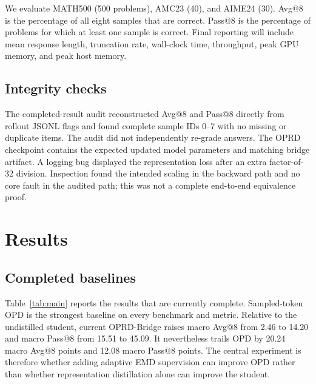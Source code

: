 \documentclass[10pt,twocolumn]{article}
\begin{document}
We evaluate MATH500 (500 problems), AMC23 (40), and AIME24 (30). Avg@8 is the percentage of all eight samples that are correct. Pass@8 is the percentage of problems for which at least one sample is correct. Final reporting will include mean response length, truncation rate, wall-clock time, throughput, peak GPU memory, and peak host memory.

\subsection{Integrity checks}

The completed-result audit reconstructed Avg@8 and Pass@8 directly from rollout JSONL flags and found complete sample IDs 0--7 with no missing or duplicate items. The audit did not independently re-grade answers. The OPRD checkpoint contains the expected updated model parameters and matching bridge artifact. A logging bug displayed the representation loss after an extra factor-of-32 division. Inspection found the intended scaling in the backward path and no core fault in the audited path; this was not a complete end-to-end equivalence proof.

\section{Results}

\subsection{Completed baselines}

Table~\ref{tab:main} reports the results that are currently complete. Sampled-token OPD is the strongest baseline on every benchmark and metric. Relative to the undistilled student, current OPRD-Bridge raises macro Avg@8 from 2.46 to 14.20 and macro Pass@8 from 15.51 to 45.09. It nevertheless trails OPD by 20.24 macro Avg@8 points and 12.08 macro Pass@8 points. The central experiment is therefore whether adding adaptive EMD supervision can improve OPD rather than whether representation distillation alone can improve the student.
\end{document}
